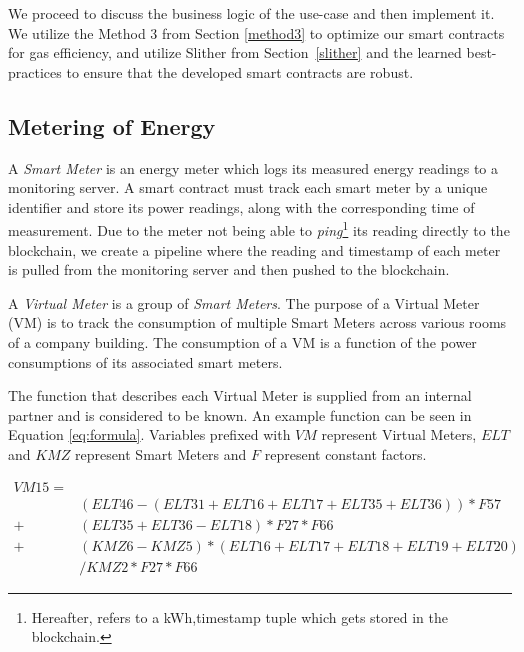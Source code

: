We proceed to discuss the business logic of the use-case and then implement it. We utilize the Method 3 from Section \ref{method3} to optimize our smart contracts for gas efficiency, and utilize Slither from Section~\ref{slither} and the learned best-practices to ensure that the developed smart contracts are robust. 

\subsection{Metering of Energy} \label{metering}


A \textit{Smart Meter} is an energy meter which logs its measured energy readings to a monitoring server. A smart contract must track each smart meter by a unique identifier and store its power readings, along with the corresponding time of measurement. Due to the meter not being able to \textit{ping}\footnote{Hereafter, refers to a kWh,timestamp tuple which gets stored in the blockchain.} its reading directly to the blockchain, we create a pipeline where the reading and timestamp of each meter is pulled from the monitoring server and then pushed to the blockchain. 




A \textit{Virtual Meter} is a group of \textit{Smart Meters}. The purpose of a Virtual Meter (VM) is to track the consumption of multiple Smart Meters across various rooms of a company building. The consumption of a VM is a function of the power consumptions of its associated smart meters. 

The function that describes each Virtual Meter is supplied from an internal partner and is considered to be known. An example function can be seen in Equation \ref{eq:formula}. Variables prefixed with $VM$ represent Virtual Meters, $ELT$ and $KMZ$ represent Smart Meters and $F$ represent constant factors.

\begin{equation} \label{eq:formula}
    \begin{aligned}
        VM15= \\
        & (ELT46-(ELT31+ELT16+ELT17+ELT35+ELT36))*F57
        \\
        + & (ELT35+ELT36-ELT18)*F27*F66
        \\
        + & (KMZ6-KMZ5)*(ELT16+ELT17+ELT18+ELT19+ELT20)\\
        & /KMZ2*F27*F66 
    \end{aligned}
\end{equation}

